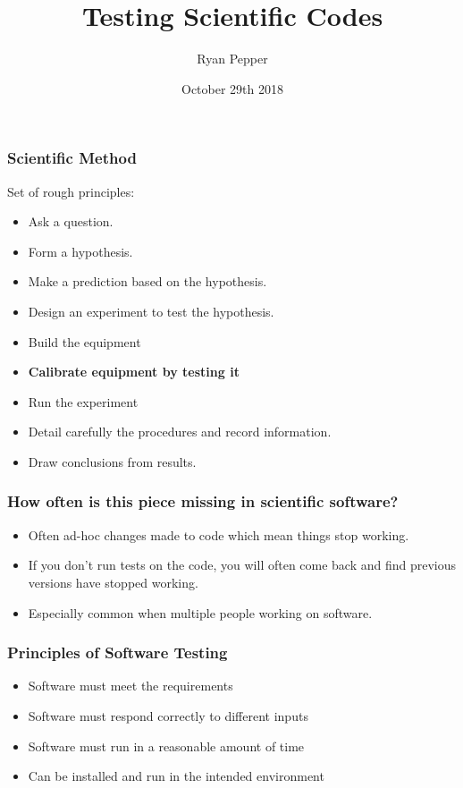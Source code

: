 \documentclass{beamer}
\title[Modern Software Development Practices]{Testing Scientific Codes} %
\author{Ryan Pepper} %
\institute[University of Southampton] %
{
University of Southampton \\ %
\medskip
\textit{ryan.pepper@soton.ac.uk} %
}
\date{October 29th 2018} %
\begin{document}
\begin{frame}
\titlepage %
\end{frame}


\begin{frame}
\frametitle{Scientific Method}
Set of rough principles:
\begin{itemize}
\item Ask a question.
\item Form a hypothesis.
\item Make a prediction based on the hypothesis.
\item Design an experiment to test the hypothesis.
\item Build the equipment
\item \textbf{Calibrate equipment by testing it}
\item Run the experiment
\item Detail carefully the procedures and record information.
\item Draw conclusions from results.
\end{itemize}
\end{frame}

\begin{frame}
\frametitle{How often is this piece missing in scientific software?}
\begin{itemize}
    \item Often ad-hoc changes made to code which mean things stop working.
    \item If you don't run tests on the code, you will often come back and find previous versions have stopped working.
    \item Especially common when multiple people working on software.
\end{itemize}
\end{frame}

\begin{frame}
\frametitle{Principles of Software Testing}
\begin{itemize}
\item Software must meet the requirements
\item Software must respond correctly to different inputs
\item Software must run in a reasonable amount of time
\item Can be installed and run in the intended environment
\end{itemize}
\end{frame}
\end{document}
